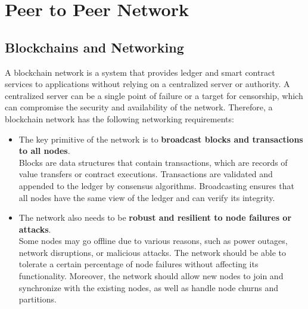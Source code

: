 \chapter{Peer to Peer Network}
\section{Blockchains and Networking}
A blockchain network is a system that provides ledger and smart contract services to applications without relying on a centralized server or authority. A centralized server can be a single point of failure or a target for censorship, which can compromise the security and availability of the network. Therefore, a blockchain network has the following networking requirements:
\begin{itemize}
	\item 
	The key primitive of the network is to \textbf{broadcast blocks and transactions to all nodes}.\\ Blocks are data structures that contain transactions, which are records of value transfers or contract executions. Transactions are validated and appended to the ledger by consensus algorithms. Broadcasting ensures that all nodes have the same view of the ledger and can verify its integrity.
	\item 
	The network also needs to be \textbf{robust and resilient to node failures or attacks}. \\ Some nodes may go offline due to various reasons, such as power outages, network disruptions, or malicious attacks. The network should be able to tolerate a certain percentage of node failures without affecting its functionality. Moreover, the network should allow new nodes to join and synchronize with the existing nodes, as well as handle node churns and partitions.
\end{itemize}
